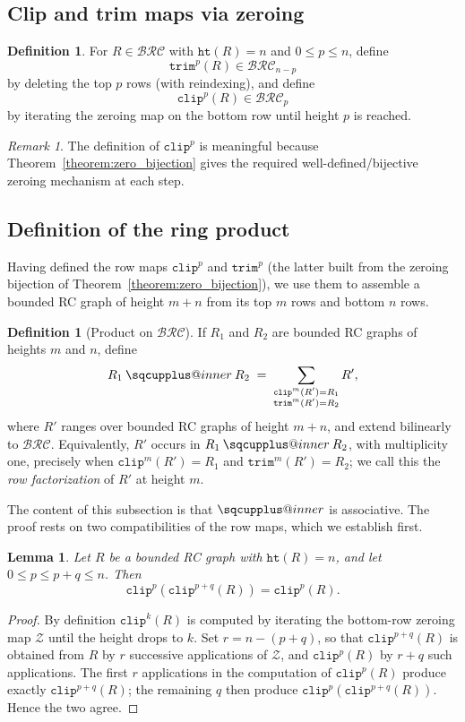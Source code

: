 \documentclass{amsart}
\makeatletter
\newtheorem{lemma}[theorem]{Lemma}
\theoremstyle{definition}
\newtheorem{definition}[theorem]{Definition}
\theoremstyle{remark}
\newtheorem{remark}[theorem]{Remark}
\newcommand{\BRC}{\mathcal{BRC}}
\newcommand{\hr}{\mathtt{ht}}
\newcommand{\trm}{\mathtt{trim}}
\newcommand{\clp}{\mathtt{clip}}
\newcommand{\zeromap}{\mathcal{Z}}
\newcommand{\sqcupplus@inner}[2]{%
  \vcenter{\hbox{\ooalign{%
    \hfil$\m@th#1\sqcup$\hfil\cr
    \hfil\raisebox{0.15ex}{$\m@th#1\scriptscriptstyle+$}\hfil\cr
  }}}%
}
\newcommand{\sqcupplus}{\mathbin{\mathpalette\sqcupplus@inner\relax}}
\makeatother
\begin{document}
\subsection{Clip and trim maps via zeroing}

\begin{definition}
For $R\in\BRC$ with $\hr(R)=n$ and $0\le p\le n$, define
\[
\trm^p(R)\in\BRC_{n-p}
\]
by deleting the top $p$ rows (with reindexing), and define
\[
\clp^p(R)\in\BRC_p
\]
by iterating the zeroing map on the bottom row until height $p$ is reached.
\end{definition}

\begin{remark}
The definition of $\clp^p$ is meaningful because Theorem~\ref{theorem:zero_bijection} gives the required well-defined/bijective zeroing mechanism at each step.
\end{remark}

\subsection{Definition of the ring product}\label{section:ringproduct}

Having defined the row maps $\clp^p$ and $\trm^p$ (the latter built from the zeroing bijection of Theorem~\ref{theorem:zero_bijection}), we use them to assemble a bounded RC graph of height $m+n$ from its top $m$ rows and bottom $n$ rows.

\begin{definition}[Product on $\BRC$]\label{definition:ringproduct}
If $R_1$ and $R_2$ are bounded RC graphs of heights $m$ and $n$, define
\[
R_1\sqcupplus R_2\;=\;\sum_{\substack{\clp^m(R')=R_1\\\trm^m(R')=R_2}} R',
\]
where $R'$ ranges over bounded RC graphs of height $m+n$, and extend bilinearly to $\BRC$. Equivalently, $R'$ occurs in $R_1\sqcupplus R_2$, with multiplicity one, precisely when $\clp^m(R')=R_1$ and $\trm^m(R')=R_2$; we call this the \emph{row factorization} of $R'$ at height $m$.
\end{definition}

The content of this subsection is that $\sqcupplus$ is associative. The proof rests on two compatibilities of the row maps, which we establish first.

\begin{lemma}\label{lemma:clpfunc}
Let $R$ be a bounded RC graph with $\hr(R)=n$, and let $0\leq p\leq p+q\leq n$. Then
\[
\clp^p(\clp^{p+q}(R))=\clp^p(R).
\]
\end{lemma}
\begin{proof}
By definition $\clp^k(R)$ is computed by iterating the bottom-row zeroing map $\zeromap$ until the height drops to $k$. Set $r=n-(p+q)$, so that $\clp^{p+q}(R)$ is obtained from $R$ by $r$ successive applications of $\zeromap$, and $\clp^p(R)$ by $r+q$ such applications. The first $r$ applications in the computation of $\clp^p(R)$ produce exactly $\clp^{p+q}(R)$; the remaining $q$ then produce $\clp^p(\clp^{p+q}(R))$. Hence the two agree.
\end{proof}
\end{document}
